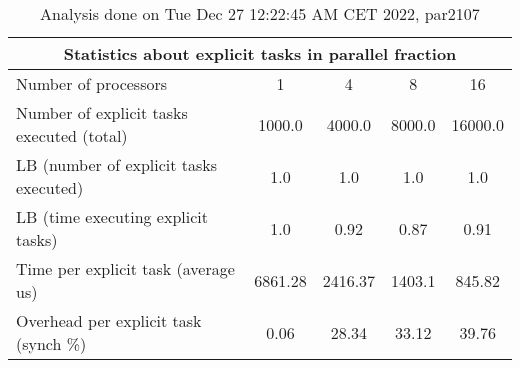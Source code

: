 \begin{table}[h]
\begin{center}
\begin{tabular}{|l|c|c|c|c|}
\hline
\multicolumn{5}{|c|}{Statistics about explicit tasks in parallel fraction} \\
\hline
\hline
Number of processors & 1 & 4 & 8 & 16 \\
\hline
\hline
Number of explicit tasks executed (total)        &          1000.0 &          4000.0 &          8000.0 &         16000.0 \\
\hline
LB (number of explicit tasks executed)           &             1.0 &             1.0 &             1.0 &             1.0 \\
\hline
LB (time executing explicit tasks)               &             1.0 &            0.92 &            0.87 &            0.91 \\
\hline
Time per explicit task (average us)                 &         6861.28 &         2416.37 &          1403.1 &          845.82 \\
\hline
Overhead per explicit task (synch \%)             &            0.06 &           28.34 &           33.12 &           39.76 \\
\hline
\end{tabular}
\end{center}
\caption{ Analysis done on Tue Dec 27 12:22:45 AM CET 2022, par2107}
\end{table}
